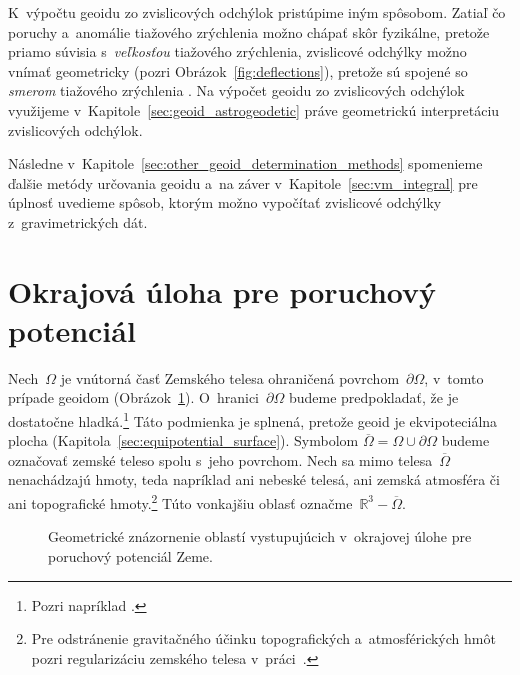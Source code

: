 \documentclass[a4paper, 12pt]{book}
\begin{document}
K~výpočtu geoidu zo zvislicových odchýlok pristúpime iným spôsobom.  Zatiaľ čo 
poruchy a~anomálie tiažového zrýchlenia možno chápať skôr fyzikálne, pretože 
priamo súvisia s~\emph{veľkosťou} tiažového zrýchlenia, zvislicové odchýlky 
možno vnímať geometricky (pozri Obrázok~\ref{fig:deflections}), pretože sú 
spojené so \emph{smerom} tiažového zrýchlenia 
\parencite{MoritzPhysicalGeodesy}.  Na výpočet geoidu zo zvislicových odchýlok 
využijeme v~Kapitole~\ref{sec:geoid_astrogeodetic} práve geometrickú 
interpretáciu zvislicových odchýlok.

Následne v~Kapitole~\ref{sec:other_geoid_determination_methods} spomenieme 
ďalšie metódy určovania geoidu a~na záver v~Kapitole~\ref{sec:vm_integral} pre 
úplnosť uvedieme spôsob, ktorým možno vypočítať zvislicové odchýlky 
z~gravimetrických dát.


\section{Okrajová úloha pre poruchový potenciál}
\label{sec:boundary_value_problem}

Nech~$\Omega$ je vnútorná časť Zemského telesa ohraničená povrchom~$\partial 
\Omega$, v~tomto prípade geoidom (Obrázok~\ref{fig:boundary_value_problems}).  
O~hranici~$\partial \Omega$ budeme predpokladať, že je dostatočne 
hladká.\footnote{Pozri napríklad \textcite{SansoGeoidDetermination}.}  Táto 
podmienka je splnená, pretože geoid je ekvipoteciálna plocha 
(Kapitola~\ref{sec:equipotential_surface}).  Symbolom $\overline{\Omega} 
= \Omega \cup \partial\Omega$ budeme označovať zemské teleso spolu s~jeho 
povrchom.  Nech sa mimo telesa~$\overline{\Omega}$ nenachádzajú hmoty, teda 
napríklad ani nebeské telesá, ani zemská atmosféra či ani topografické 
hmoty.\footnote{Pre odstránenie gravitačného účinku topografických 
a~atmosférických hmôt pozri regularizáciu zemského telesa 
v~práci~\textcite{Janak2006}.}  Túto vonkajšiu oblasť označme~$\mathbb{R}^3 
- \overline{\Omega}$.

\begin{figure}[bt]
\centering

\caption{Geometrické znázornenie oblastí vystupujúcich v~okrajovej úlohe pre 
poruchový potenciál Zeme.}
\label{fig:boundary_value_problems}
\end{figure}
\end{document}
